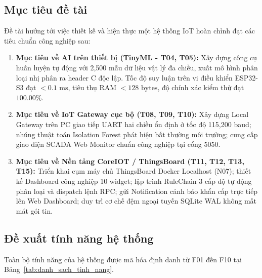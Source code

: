 \subsection{Mục tiêu đề tài}
Đề tài hướng tới việc thiết kế và hiện thực một hệ thống IoT hoàn chỉnh đạt các tiêu chuẩn công nghiệp sau:
\begin{enumerate}
    \item \textbf{Mục tiêu về AI trên thiết bị (TinyML - T04, T05):} Xây dựng công cụ huấn luyện tự động với 2,500 mẫu dữ liệu vật lý đa chiều, xuất mô hình phân loại nhị phân ra header C độc lập. Tốc độ suy luận trên vi điều khiển ESP32-S3 đạt $<0.1\text{ ms}$, tiêu thụ RAM $<128\text{ bytes}$, độ chính xác kiểm thử đạt $100.00\%$.
    \item \textbf{Mục tiêu về IoT Gateway cục bộ (T08, T09, T10):} Xây dựng Local Gateway trên PC giao tiếp UART hai chiều ổn định ở tốc độ 115,200 baud; nhúng thuật toán Isolation Forest phát hiện bất thường môi trường; cung cấp giao diện SCADA Web Monitor chuẩn công nghiệp tại cổng 5050.
    \item \textbf{Mục tiêu về Nền tảng CoreIOT / ThingsBoard (T11, T12, T13, T15):} Triển khai cụm máy chủ ThingsBoard Docker Localhost (N07); thiết kế Dashboard công nghiệp 10 widget; lập trình RuleChain 3 cấp độ tự động phân loại và dispatch lệnh RPC; gửi Notification cảnh báo khẩn cấp trực tiếp lên Web Dashboard; duy trì cơ chế đệm ngoại tuyến SQLite WAL không mất mát gói tin.
\end{enumerate}

\subsection{Đề xuất tính năng hệ thống}
Toàn bộ tính năng của hệ thống được mã hóa định danh từ F01 đến F10 tại Bảng~\ref{tab:danh_sach_tinh_nang}.

